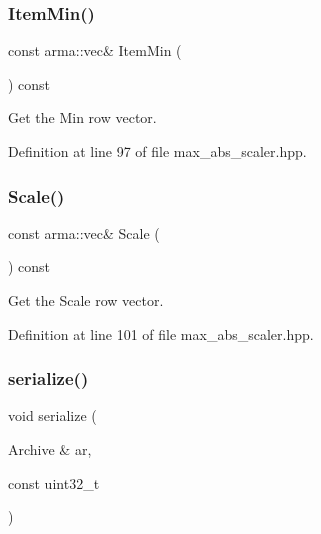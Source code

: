 \mbox{\label{classmlpack_1_1data_1_1MaxAbsScaler_ae9ae591f227874f238c38d4cf070c6c8}} 
\subsubsection{Item\+Min()}
{\footnotesize\ttfamily const arma\+::vec\& Item\+Min (\begin{DoxyParamCaption}{ }\end{DoxyParamCaption}) const\hspace{0.3cm}{\ttfamily [inline]}}



Get the Min row vector. 



Definition at line 97 of file max\+\_\+abs\+\_\+scaler.\+hpp.

\mbox{\label{classmlpack_1_1data_1_1MaxAbsScaler_a5adcafebd2c229793e57b7268c90a0fe}} 
\subsubsection{Scale()}
{\footnotesize\ttfamily const arma\+::vec\& Scale (\begin{DoxyParamCaption}{ }\end{DoxyParamCaption}) const\hspace{0.3cm}{\ttfamily [inline]}}



Get the Scale row vector. 



Definition at line 101 of file max\+\_\+abs\+\_\+scaler.\+hpp.

\mbox{\label{classmlpack_1_1data_1_1MaxAbsScaler_a65cba07328997659bec80b9879b15a51}} 
\subsubsection{serialize()}
{\footnotesize\ttfamily void serialize (\begin{DoxyParamCaption}\item[{Archive \&}]{ar,  }\item[{const uint32\+\_\+t}]{ }\end{DoxyParamCaption})\hspace{0.3cm}{\ttfamily [inline]}}



